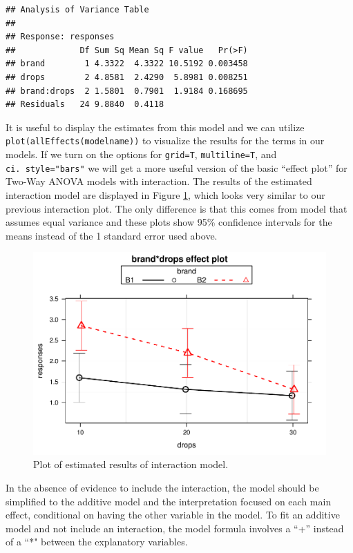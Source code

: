 \documentclass[]{book}
\theoremstyle{definition}
\theoremstyle{definition}
\theoremstyle{remark}
\begin{document}
\begin{verbatim}
## Analysis of Variance Table
## 
## Response: responses
##             Df Sum Sq Mean Sq F value   Pr(>F)
## brand        1 4.3322  4.3322 10.5192 0.003458
## drops        2 4.8581  2.4290  5.8981 0.008251
## brand:drops  2 1.5801  0.7901  1.9184 0.168695
## Residuals   24 9.8840  0.4118
\end{verbatim}

It is useful to display the estimates from this model and we can utilize
\texttt{plot(allEffects(modelname))} to visualize the results for the
terms in our models. If we turn on the options for \texttt{grid=T},
\texttt{multiline=T}, and \texttt{ci.\ style="bars"} we will get a more
useful version of the basic ``effect plot'' for Two-Way ANOVA models
with interaction. The results of the estimated interaction model are
displayed in Figure \ref{fig:Figure4-6}, which looks very similar to our
previous interaction plot. The only difference is that this comes from
model that assumes equal variance and these plots show 95\% confidence
intervals for the means instead of the 1 standard error used above.



\begin{figure}
\centering
\includegraphics{04-twoWayAnova_files/figure-latex/Figure4-6-1.pdf}
\caption{\label{fig:Figure4-6}Plot of estimated results of interaction model.}
\end{figure}

In the absence of evidence to include the interaction, the model should
be simplified to the additive model and the interpretation focused on
each main effect, conditional on having the other variable in the model.
To fit an additive model and not include an interaction, the model
formula involves a ``+'' instead of a ``*" between the explanatory
variables.
\end{document}
